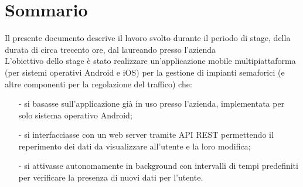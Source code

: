 
\cleardoublepage
{}
{}
\begingroup
\let\clearpage\relax
\let\cleardoublepage\relax
\let\cleardoublepage\relax

\chapter*{Sommario}

Il presente documento descrive il lavoro svolto durante il periodo di stage, della durata di circa trecento ore, dal laureando \myName{} presso l'azienda \myCompany{}\\
L'obiettivo dello stage è stato realizzare un’applicazione mobile multipiattaforma (per sistemi operativi Android e iOS) per la gestione di impianti semaforici (e altre componenti per la regolazione del traffico) che:
\begin{itemize}
    \item[-] si basasse sull'applicazione già in uso presso l'azienda, implementata per solo sistema operativo Android;
    \item[-] si interfacciasse con un web server tramite API REST permettendo il reperimento dei dati da visualizzare all’utente e la loro modifica;
    \item[-] si attivasse autonomamente in background con intervalli di tempi predefiniti per verificare la presenza di nuovi dati per l’utente.
\end{itemize}

%
%

\endgroup			

\vfill

